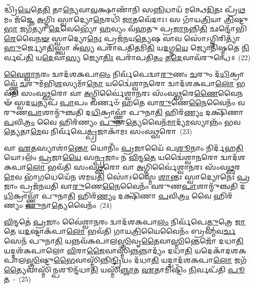𑌦𑍍𑌧𑍍𑌰𑌿᳴\-\ul{𑌯𑍇}\-𑌤𑍇\-\ul{𑌤𑌿} 𑌤𑌾\-\ul{𑌨𑍍𑌯𑍇}\-𑌵𑌾\-\ul{𑌵}\-𑌕𑍍𑌷𑌾𑌣𑌾᳴𑌨𑌿 𑌸\-\ul{𑌨𑍍𑌨𑌿}\-𑌧𑌾𑌯᳴ 𑌮𑌨𑍍𑌥𑍇\-\ul{𑌦𑌿}\-𑌤𑌃 𑌪𑍍𑌰᳴\-\ul{𑌥}\-𑌮𑌂 𑌜᳴𑌜𑍍𑌞𑍇 \ul{𑌅}\-𑌗𑍍𑌨𑌿𑌃 𑌸𑍍𑌵𑌾𑌦𑍍𑌯𑍋\-\ul{𑌨𑍇}\-𑌰𑌧𑌿᳴ \ul{𑌜𑌾}\-𑌤𑌵𑍇᳴𑌦𑌾𑌃। 𑌸 𑌗𑌾᳴𑌯\-\ul{𑌤𑍍𑌰𑌿}\-𑌯𑌾 \ul{𑌤𑍍𑌰𑌿}\-𑌷𑍍𑌟𑍁\-\ul{𑌭𑌾} 𑌜𑌗᳴𑌤𑍍𑌯𑌾 \ul{𑌦𑍇}\-𑌵𑍇𑌭𑍍𑌯𑍋᳴ \ul{𑌹}\-𑌵𑍍𑌯𑌂 𑌵᳴𑌹𑌤𑍁 𑌪𑍍𑌰\-\ul{𑌜𑌾}\-𑌨𑌨𑍍𑌨𑌿\-\ul{𑌤𑌿} 𑌛𑌨𑍍𑌦𑍋᳴𑌭𑌿\-\ul{𑌰𑍇}\-𑌵𑍈\-\ul{𑌨}\-\-\ul{𑍟} 𑌸𑍍𑌵𑌾𑌦𑍍𑌯𑍋\-\ul{𑌨𑍇𑌃} 𑌪𑍍𑌰𑌜᳴𑌨𑌯\-\ul{𑌤𑍍𑌯𑍇}\-𑌷 𑌵𑌾𑌵 𑌸𑍋॑\-𑌽𑌗𑍍𑌨𑌿𑌰𑌿𑌤𑍍𑌯𑌾᳴\-\ul{𑌹𑍁}\-𑌰𑍍𑌜𑍍𑌯𑍋\-\ul{𑌤𑌿}\-𑌸𑍍𑌤𑍍𑌵𑌾 𑌅᳴\-\ul{𑌸𑍍𑌯} 𑌪𑌰𑌾᳴𑌪𑌤𑌿\-\ul{𑌤}\-𑌮𑌿\-\ul{𑌤𑌿} 𑌯\-\ul{𑌦}\-𑌗𑍍𑌨\-\ul{𑌯𑍇} 𑌜𑍍𑌯𑍋𑌤𑌿᳴𑌷𑍍𑌮𑌤𑍇 \ul{𑌨𑌿}\-𑌰𑍍𑌵𑌪᳴\-\ul{𑌤𑌿} 𑌯\-\ul{𑌦𑍇}\-𑌵𑌾\-\ul{𑌸𑍍𑌯} 𑌜𑍍𑌯𑍋\-\ul{𑌤𑌿𑌃} 𑌪𑌰𑌾᳴𑌪𑌤𑌿\-\ul{𑌤𑌂} 𑌤\-\ul{𑌦𑍇}\-\-𑌵𑌾𑌵᳴\-𑌰𑍁𑌨𑍍𑌧𑍇॥~(22)

{\anuvakamend[{\-\ul{𑌕}\-\-\ul{𑌰𑍋}\-\-\ul{𑌤𑍍𑌯}\-\-\ul{𑌨𑍍𑌨𑌾}\-𑌦𑍋 𑌦᳴𑌧𑌾\-\ul{𑌤𑌿} 𑌯\-\ul{𑌦}\-𑌗𑍍𑌨\-\ul{𑌯𑍇} 𑌶𑍁𑌚᳴\-\ul{𑌯𑍇} 𑌚𑌕𑍍𑌷𑍁᳴\-\ul{𑌰𑍇}\-𑌵𑌾\-\ul{𑌸𑍍𑌮𑌿}\-𑌨𑍍𑌤𑍇𑌨᳴ 𑌦𑌧𑌾𑌤𑌿 𑌕𑌰𑍋\-\ul{𑌤𑌿} 𑌵𑌾\-\ul{𑌜𑌂} 𑌯𑌜᳴𑌮𑌾\-\ul{𑌨}\-𑌮𑍁\-\ul{𑌦𑍇}\-𑌵𑌾\-\ul{𑌸𑍍𑌯} 𑌷𑌟𑍍𑌚᳴}]}%

\-\ul{𑌵𑍈}\-\-\ul{𑌶𑍍𑌵𑌾}\-\-\ul{𑌨}\-𑌰𑌂 𑌦𑍍𑌵𑌾𑌦᳴𑌶\-𑌕𑌪𑌾\-\ul{𑌲𑌂} 𑌨𑌿𑌰𑍍𑌵᳴𑌪𑍇𑌦𑍍𑌵𑌾\-\ul{𑌰𑍁}\-𑌣𑌂 \ul{𑌚}\-𑌰𑍁𑌂 𑌦᳴\-\ul{𑌧𑌿}\-𑌕𑍍𑌰𑌾𑌵𑍍𑌣𑍍𑌣𑍇᳴ \ul{𑌚}\-𑌰𑍁𑌮᳴𑌭𑌿\-\ul{𑌶}\-𑌸𑍍𑌯𑌮𑌾᳴\-\ul{𑌨𑍋} 𑌯𑌦𑍍𑌵𑍈॑𑌶𑍍𑌵𑌾\-\ul{𑌨}\-𑌰𑍋 𑌦𑍍𑌵𑌾𑌦᳴𑌶\-𑌕𑌪𑌾\-\ul{𑌲𑍋} 𑌭𑌵᳴𑌤𑌿 𑌸𑌂𑌵\-\ul{𑌥𑍍𑌸}\-𑌰𑍋 𑌵𑌾 \ul{𑌅}\-𑌗𑍍𑌨𑌿𑌰𑍍𑌵𑍈॑𑌶𑍍𑌵𑌾\-\ul{𑌨}\-𑌰𑌃 𑌸𑌂᳴𑌵\-\ul{𑌥𑍍𑌸}\-𑌰𑍇\-\ul{𑌣𑍈}\-𑌵𑍈𑌨𑍟᳴ 𑌸𑍍𑌵𑌦\-\ul{𑌯}\-𑌤𑍍𑌯𑌪᳴ \ul{𑌪𑌾}\-𑌪𑌂 𑌵𑌰𑍍𑌣𑍞᳴ 𑌹𑌤𑍇 𑌵𑌾\-\ul{𑌰𑍁}\-𑌣𑍇\-\ul{𑌨𑍈}\-𑌵𑍈𑌨𑌂᳴ 𑌵𑌰𑍁𑌣\-\ul{𑌪𑌾}\-𑌶𑌾𑌨𑍍𑌮𑍁᳴𑌞𑍍𑌚𑌤𑌿 𑌦\-\ul{𑌧𑌿}\-𑌕𑍍𑌰𑌾𑌵𑍍𑌣𑍍𑌣𑌾᳴ 𑌪𑍁𑌨𑌾\-\ul{𑌤𑌿} 𑌹𑌿𑌰᳴\-\ul{𑌣𑍍𑌯𑌂} 𑌦𑌕𑍍𑌷𑌿᳴𑌣𑌾 \ul{𑌪}\-𑌵𑌿\-\ul{𑌤𑍍𑌰𑌂} 𑌵𑍈 𑌹𑌿𑌰᳴𑌣𑍍𑌯𑌂 \ul{𑌪𑍁}\-𑌨𑌾\-\ul{𑌤𑍍𑌯𑍇}\-𑌵𑍈𑌨᳴\-\ul{𑌮𑌾}\-𑌦𑍍𑌯᳴\-\ul{𑌮}\-𑌸𑍍𑌯𑌾𑌨𑍍𑌨𑌂᳴ 𑌭𑌵\-\ul{𑌤𑍍𑌯𑍇}\-𑌤𑌾\-\ul{𑌮𑍇}\-𑌵 𑌨𑌿𑌰𑍍𑌵᳴𑌪𑍇\-\ul{𑌤𑍍𑌪𑍍𑌰}\-𑌜𑌾𑌕𑌾᳴𑌮𑌃 𑌸𑌂𑌵\-\ul{𑌥𑍍𑌸}\-𑌰𑍋~(23)

𑌵𑌾 \ul{𑌏}\-𑌤𑌸𑍍𑌯𑌾𑌶𑌾॑\-\ul{𑌨𑍍𑌤𑍋} 𑌯𑍋𑌨𑌿𑌂᳴ \ul{𑌪𑍍𑌰}\-𑌜𑌾𑌯𑍈᳴ 𑌪\-\ul{𑌶𑍂}\-𑌨𑌾𑌂 𑌨𑌿𑌰𑍍𑌦᳴𑌹\-\ul{𑌤𑌿} 𑌯𑍋\-𑌽𑌲𑌂᳴ \ul{𑌪𑍍𑌰}\-𑌜𑌾\-\ul{𑌯𑍈} 𑌸\-\ul{𑌨𑍍𑌪𑍍𑌰}\-𑌜𑌾𑌂 𑌨 \ul{𑌵𑌿}\-𑌨𑍍𑌦\-\ul{𑌤𑍇} 𑌯𑌦𑍍𑌵𑍈॑𑌶𑍍𑌵𑌾\-\ul{𑌨}\-𑌰𑍋 𑌦𑍍𑌵𑌾𑌦᳴𑌶\-𑌕𑌪𑌾\-\ul{𑌲𑍋} 𑌭𑌵᳴𑌤𑌿 𑌸𑌂𑌵\-\ul{𑌥𑍍𑌸}\-𑌰𑍋 𑌵𑌾 \ul{𑌅}\-𑌗𑍍𑌨𑌿𑌰𑍍𑌵𑍈॑𑌶𑍍𑌵𑌾\-\ul{𑌨}\-𑌰𑌃 𑌸𑌂᳴𑌵\-\ul{𑌥𑍍𑌸}\-𑌰\-\ul{𑌮𑍇}\-𑌵 𑌭𑌾᳴\-\ul{𑌗}\-𑌧𑍇𑌯𑍇᳴𑌨 𑌶𑌮𑌯\-\ul{𑌤𑌿} 𑌸𑍋॑\-𑌽𑌸𑍍𑌮𑍈 \ul{𑌶𑌾}\-𑌨𑍍𑌤𑌃 𑌸𑍍𑌵𑌾𑌦𑍍𑌯𑍋𑌨𑍇𑌃॑ \ul{𑌪𑍍𑌰}\-𑌜𑌾𑌂 𑌪𑍍𑌰𑌜᳴𑌨𑌯𑌤𑌿 𑌵𑌾\-\ul{𑌰𑍁}\-𑌣𑍇\-\ul{𑌨𑍈}\-𑌵𑍈𑌨𑌂᳴ 𑌵𑌰𑍁𑌣\-\ul{𑌪𑌾}\-𑌶𑌾𑌨𑍍𑌮𑍁᳴𑌞𑍍𑌚𑌤𑌿 𑌦\-\ul{𑌧𑌿}\-𑌕𑍍𑌰𑌾𑌵𑍍𑌣𑍍𑌣𑌾᳴ 𑌪𑍁𑌨𑌾\-\ul{𑌤𑌿} 𑌹𑌿𑌰᳴\-\ul{𑌣𑍍𑌯𑌂} 𑌦𑌕𑍍𑌷𑌿᳴𑌣𑌾 \ul{𑌪}\-𑌵𑌿\-\ul{𑌤𑍍𑌰𑌂} 𑌵𑍈 𑌹𑌿𑌰᳴𑌣𑍍𑌯𑌂 \ul{𑌪𑍁}\-𑌨𑌾\-\ul{𑌤𑍍𑌯𑍇}\-𑌵𑍈𑌨𑌂᳴~(24)

\-\ul{𑌵𑌿}\-𑌨𑍍𑌦𑌤𑍇॑ \ul{𑌪𑍍𑌰}\-𑌜𑌾𑌂 𑌵𑍈॑𑌶𑍍𑌵𑌾\-\ul{𑌨}\-𑌰𑌂 𑌦𑍍𑌵𑌾𑌦᳴𑌶\-𑌕𑌪𑌾\-\ul{𑌲𑌂} 𑌨𑌿𑌰𑍍𑌵᳴𑌪𑍇\-\ul{𑌤𑍍𑌪𑍁}\-𑌤𑍍𑌰𑍇 \ul{𑌜𑌾}\-𑌤𑍇 𑌯\-\ul{𑌦}\-𑌷𑍍𑌟𑌾𑌕᳴𑌪𑌾\-\ul{𑌲𑍋} 𑌭𑌵᳴𑌤𑌿 𑌗𑌾𑌯\-\ul{𑌤𑍍𑌰𑌿}\-𑌯𑍈𑌵𑍈𑌨𑌂᳴ 𑌬𑍍𑌰𑌹𑍍𑌮𑌵\-\ul{𑌰𑍍𑌚}\-𑌸𑍇𑌨᳴ 𑌪𑍁𑌨𑌾\-\ul{𑌤𑌿} 𑌯𑌨𑍍𑌨𑌵᳴𑌕𑌪𑌾𑌲\-\ul{𑌸𑍍𑌤𑍍𑌰𑌿}\-𑌵𑍃\-\ul{𑌤𑍈}\-𑌵𑌾\-\ul{𑌸𑍍𑌮𑌿}\-𑌨𑍍𑌤𑍇𑌜𑍋᳴ 𑌦𑌧𑌾\-\ul{𑌤𑌿} 𑌯𑌦𑍍𑌦𑌶᳴\-𑌕𑌪𑌾𑌲𑍋 \ul{𑌵𑌿}\-𑌰𑌾\-\ul{𑌜𑍈}\-𑌵𑌾𑌸𑍍𑌮𑌿᳴\-\ul{𑌨𑍍𑌨}\-𑌨𑍍𑌨𑌾𑌦𑍍𑌯𑌂᳴ 𑌦𑌧𑌾\-\ul{𑌤𑌿} 𑌯𑌦𑍇𑌕𑌾᳴\-𑌦𑌶\-𑌕𑌪𑌾𑌲\-\ul{𑌸𑍍𑌤𑍍𑌰𑌿}\-𑌷𑍍𑌟𑍁\-\ul{𑌭𑍈}\-𑌵𑌾\-𑌸𑍍𑌮𑌿᳴𑌨𑍍𑌨𑌿\-\ul{𑌨𑍍𑌦𑍍𑌰𑌿}\-𑌯𑌂 𑌦᳴𑌧𑌾\-\ul{𑌤𑌿} 𑌯𑌦𑍍𑌦𑍍𑌵𑌾𑌦᳴𑌶\-𑌕𑌪𑌾\-\ul{𑌲𑍋} 𑌜𑌗᳴\-\ul{𑌤𑍍𑌯𑍈}\-𑌵𑌾𑌸𑍍𑌮𑌿᳴\-\ul{𑌨𑍍𑌪}\-𑌶𑍂𑌨𑍍𑌦᳴\-𑌧𑌾\-\ul{𑌤𑌿} 𑌯𑌸𑍍𑌮𑌿᳴\-\ul{𑌞𑍍𑌜𑌾}\-𑌤 \ul{𑌏}\-𑌤𑌾𑌮𑌿𑌷𑍍𑌟𑌿𑌂᳴ \ul{𑌨𑌿}\-𑌰𑍍𑌵𑌪᳴𑌤𑌿 \ul{𑌪𑍂}\-𑌤~-~(25)

